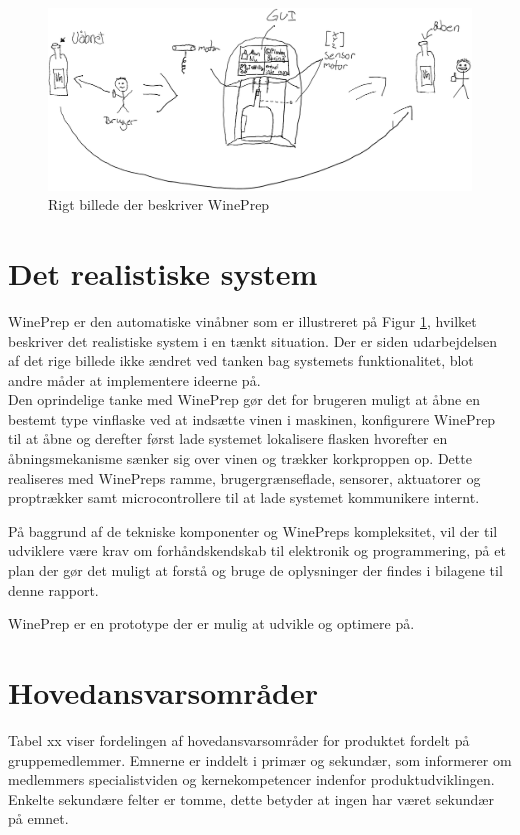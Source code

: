 \begin{figure}[H]
	\includegraphics[scale=0.6]{WinePrep_realistisk.png}
	\caption{Rigt billede der beskriver WinePrep}
	\label{RIGTBILLEDE}
\end{figure}

\section{Det realistiske system}
WinePrep er den automatiske vinåbner som er illustreret på Figur \ref{RIGTBILLEDE}, hvilket beskriver det realistiske system i en tænkt situation. Der er siden udarbejdelsen af det rige billede ikke ændret ved tanken bag systemets funktionalitet, blot andre måder at implementere ideerne på.\\

Den oprindelige tanke med WinePrep gør det for brugeren muligt at åbne en bestemt type vinflaske ved at indsætte vinen i maskinen, konfigurere WinePrep til at åbne og derefter først lade systemet lokalisere flasken hvorefter en åbningsmekanisme sænker sig over vinen og trækker korkproppen op. Dette realiseres med WinePreps ramme, brugergrænseflade, sensorer, aktuatorer og proptrækker samt microcontrollere til at lade systemet kommunikere internt.

På baggrund af de tekniske komponenter og WinePreps kompleksitet, vil der til udviklere være krav om forhåndskendskab til elektronik og programmering, på et plan der gør det muligt at forstå og bruge de oplysninger der findes i bilagene til denne rapport.

WinePrep er en prototype der er mulig at udvikle og optimere på.

\section{Hovedansvarsområder}
Tabel xx viser fordelingen af hovedansvarsområder for produktet fordelt på gruppemedlemmer. Emnerne er inddelt i primær og sekundær, som informerer om medlemmers specialistviden og kernekompetencer indenfor produktudviklingen. Enkelte sekundære felter er tomme, dette betyder at ingen har været sekundær på emnet.\\

